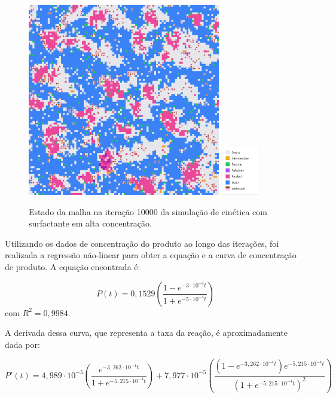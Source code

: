 \documentclass[12pt,oneside]{report}
\begin{document}
\begin{figure}[H]
    \centering
    \includegraphics[width=0.75\textwidth]{img/surf_10000_high.png}
    \hspace{0.05\textwidth}
    \includegraphics[width=0.15\textwidth]{img/legend_surf.png}
    \caption{\small Estado da malha na iteração 10000 da simulação de cinética com surfactante em alta concentração.}
    \label{fig:MM_surf_10000it_high}
\end{figure}


Utilizando os dados de concentração do produto ao longo das iterações, foi realizada a regressão não-linear para obter a equação e a curva de concentração de produto. A equação encontrada é:

\begin{equation}
    P(t) = 0{,}1529 \left(\frac{1 - e^{-3 \cdot 10^{-4} t}}{1 + e^{-5 \cdot 10^{-4} t}}\right)
    \label{eq:produto_MM_surfactant_high}
\end{equation}
com $R^2 = 0{,}9984$.

A derivada dessa curva, que representa a taxa da reação, é aproximadamente dada por:

\begin{equation}
    P'(t) = 4{,}989 \cdot 10^{-5} \left(\frac{e^{-3{,}262 \cdot 10^{-4} t}}{1 + e^{-5{,}215 \cdot 10^{-4} t}}\right) + 7{,}977 \cdot 10^{-5} \left(\frac{(1 - e^{-3{,}262 \cdot 10^{-4} t}) e^{-5{,}215 \cdot 10^{-4} t}}{(1 + e^{-5{,}215 \cdot 10^{-4} t})^2}\right)
    \label{eq:taxa_MM_surfactant_high}
\end{equation}
\end{document}
